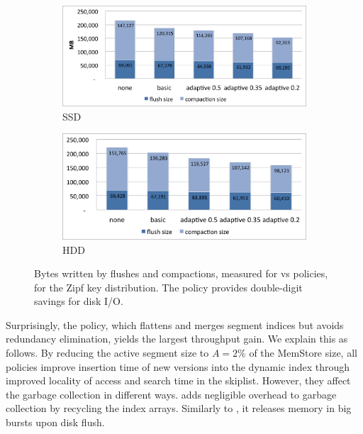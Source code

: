 \begin{figure}[t]
  \centering
  
  \begin{subfigure}[t]{\columnwidth}
      \includegraphics[width=\figw]{Figs/volume-ssd.png}
      \caption[]{SSD}
    \label{fig:volume:ssd}
  \end{subfigure}
  \begin{subfigure}[t]{\columnwidth}
      \includegraphics[width=\figw]{Figs/volume-hdd.png}
      \caption[]{HDD}
    \label{fig:volume:hdd}
  \end{subfigure}

  \caption{Bytes written by flushes and compactions, measured for \none\/ vs \sys\/ policies, for the Zipf key distribution. 
  The \adp\/ policy provides double-digit savings for disk I/O. }
  \label{fig:volume}
\end{figure}
Surprisingly, the \basic\/ policy, which flattens and merges segment indices but avoids 
redundancy elimination, yields the largest throughput gain. We explain this as follows. By reducing the active 
segment size to $A=2$\% of the MemStore size, all \sys\/ policies improve insertion time of new versions 
into the dynamic index through improved locality of access and search time in the skiplist. However, 
they affect the garbage collection in different ways. \basic\/ adds negligible overhead to 
garbage collection by recycling the index arrays. Similarly to \none, it releases memory in big bursts
upon disk flush. 

